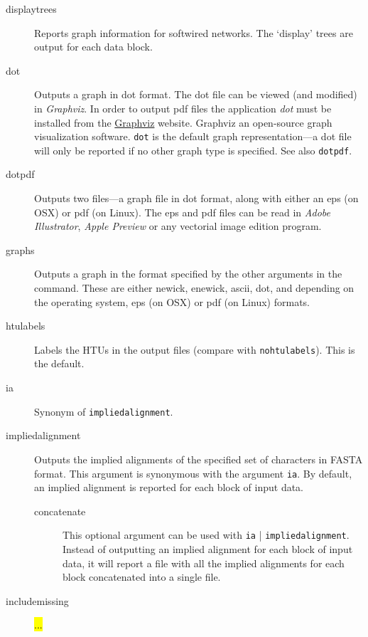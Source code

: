 \begin{description}
		\item[displaytrees] Reports graph information for softwired networks. The `display' trees 
		are output for each data block. 
		
		\item[dot] Outputs a graph in dot format. The dot file can be viewed (and 
		modified) in \textit{Graphviz}. In order to output pdf files the application 
		\textit{dot} must be installed from the \href{https://graphviz.org/download/}{Graphviz} 
		website. Graphviz an open-source graph visualization software. \texttt{dot}
		is the default graph representation---a dot file will only be reported if no 
		other graph type is specified. See also \texttt{dotpdf}.
		
		\item[dotpdf] Outputs two files---a graph file in dot format, along with either
		an eps (on OSX) or pdf (on Linux). The eps and pdf files can be read in 
		\textit{Adobe Illustrator}, \textit{Apple Preview} or any vectorial image 
		edition program.
		
		\item[graphs] Outputs a graph in the format specified by the other arguments 
		in the command. These are either newick, enewick, ascii, dot, and depending 
		on the operating system, eps (on OSX) or pdf (on Linux) formats.
		
		\item[htulabels] Labels the HTUs in the output files (compare with 
		\texttt{nohtulabels}). This is the default.
		
		\item[ia] Synonym of \texttt{impliedalignment}.
		
		\item[impliedalignment] Outputs the implied alignments of the specified 
		set of characters in FASTA format. This argument is synonymous with 
		the argument \texttt{ia}. By default, an implied alignment is reported for 
		each block of input data. 
		
		\begin{description}
			\item[concatenate] This optional argument can be used with \texttt{ia}
			| \texttt{impliedalignment}. Instead of outputting an implied alignment 
			for each block of input data, it will report a file with all the implied 
			alignments for each block concatenated into a single file.
		\end{description}
			
		\item[includemissing] \hl{...}
		

\end{description}
